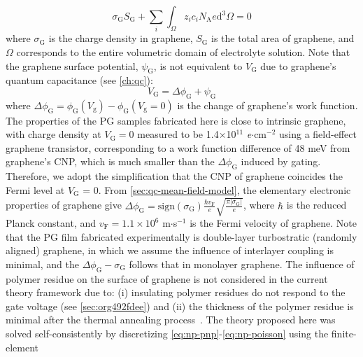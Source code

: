 \begin{equation}
  \label{eq:np-electro-neutral}
  \sigma_{\mathrm{G}} S_{\mathrm{G}} + \sum_{i} \int_{\Omega} z_{i} c_{i} N_{\mathrm{A}} e \mathrm{d}^{3} \Omega= 0
\end{equation}
where $\sigma_{\mathrm{G}}$ is the charge density in graphene,
$S_{\mathrm{G}}$ is the total area of graphene, and $\Omega$
corresponds to the entire volumetric domain of electrolyte
solution. Note that the graphene surface potential,
$\psi_{\mathrm{G}}$, is not equivalent to $V_{\mathrm{G}}$ due to graphene's quantum capacitance (see \autoref{ch:qc}):
\begin{equation}
  \label{eq:np-Vg}
  V_{\mathrm{G}} = \Delta \phi_{\mathrm{G}} + \psi_{\mathrm{G}}
\end{equation}
where
$\Delta \phi_{\mathrm{G}} = \phi_{\mathrm{G}}(V_{\mathrm{g}}) -
\phi_{\mathrm{G}}(V_{\mathrm{g}}=0)$ is the change of graphene’s work
function.
%
The properties of the PG samples fabricated here is close to intrinsic
graphene, with charge density at $V_{\mathrm{G}}=0$ measured to be
1.4$\times$10$^{11}$ \textit{e}$\cdot$cm$^{-2}$ using a field-effect
graphene transistor, corresponding to a work function difference of 48
meV from graphene's CNP, which is much smaller than the
$\Delta \phi_{\mathrm{G}}$ induced by gating.
%
Therefore, we adopt the simplification that the
CNP of graphene coincides the Fermi level at
$V_{\mathrm{G}}$ = 0.
%
From \autoref{sec:qc-mean-field-model}, the elementary electronic
properties of graphene give
\( {\displaystyle \Delta \phi_{\mathrm{G}} =
  \mathrm{sign}(\sigma_{\mathrm{G}}) \frac{\hbar v_{\mathrm{F}}}{e}
  \sqrt{\frac{\pi |\sigma_{\mathrm{G}}|}{e}}}\), where $\hbar$ is the
reduced Planck constant, and $v_{\mathrm{F}}=1.1\times10^{6}$
m$\cdot$s$^{-1}$ is the Fermi velocity of graphene.
%
Note that the PG film fabricated experimentally is double-layer
turbostratic (randomly aligned) graphene, in which we assume the
influence of interlayer coupling is minimal, and the
$\Delta \phi_{\mathrm{G}} - \sigma_{\mathrm{G}}$ follows that in
monolayer graphene.
%
The influence of polymer residue on the surface of graphene is not
considered in the current theory framework due to: (i) insulating
polymer residues do not respond to the gate voltage (see
\autoref{sec:org492fdee}) and (ii) the thickness of the polymer
residue is minimal after the thermal annealing
process~\autocite{Choi_2018_wafer_scale_gr}.
%
The theory proposed here was solved self-consistently by discretizing
\autoref{eq:np-pnp}-\autoref{eq:np-poisson} using the finite-element
